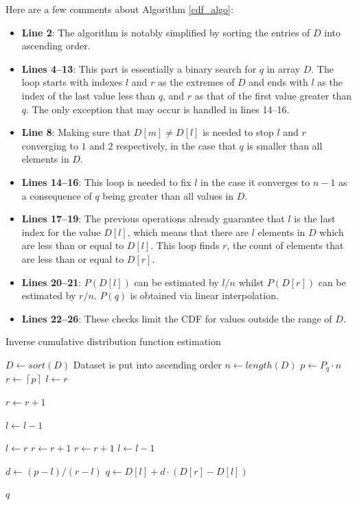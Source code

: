 \documentclass[10pt,final]{siamltex}
\begin{document}
Here are a few comments about Algorithm \ref{cdf_algo}:
\begin{itemize}
  \item \textbf{Line 2}: The algorithm is notably simplified by sorting the entries of $D$ into ascending order.
  \item \textbf{Lines 4--13}: This part is essentially a binary search for $q$ in array $D$. The loop starts with indexes $l$ and $r$ as the extremes of $D$ and ends with $l$ as the index of the last value less than $q$, and $r$ as that of the first value greater than $q$. The only exception that may occur is handled in lines 14--16.
  \item \textbf{Line 8}: Making sure that $D[m]\neq D[l]$ is needed to stop $l$ and $r$ converging to $1$ and $2$ respectively, in the case that $q$ is smaller than all elements in $D$.
  \item \textbf{Lines 14--16}: This loop is needed to fix $l$ in the case it converges to $n-1$ as a consequence of $q$ being greater than all values in $D$.
  \item \textbf{Lines 17--19}: The previous operations already guarantee that $l$ is the last index for the value $D[l]$, which means that there are $l$ elements in $D$ which are less than or equal to $D[l]$. This loop finds $r$, the count of elements that are less than or equal to $D[r]$.
  \item \textbf{Lines 20--21}: $P(D[l])$ can be estimated by $l/n$ whilst $P(D[r])$ can be estimated by $r/n$. $P(q)$ is obtained via linear interpolation.
  \item \textbf{Lines 22--26}: These checks limit the CDF for values outside the range of $D$.
\end{itemize}
%

\begin{algorithm}
  \caption{Inverse cumulative distribution function estimation}
  \label{invcdf_algo}
  \begin{algorithmic}[1]
    \State $D \gets sort(D)$
    \Comment Dataset is put into ascending order
    \State $n \gets length(D)$
    \State $p \gets P_q \cdot n$
    \State $r \gets  \left \lceil{p}\right \rceil$
    \EndIf
    \State $l \gets r$

    \State $ r \gets r + 1$
    \EndWhile

    \State $l \gets l - 1$
    \EndWhile

    \State $l \gets r$
    \State $r \gets r+1$
    \State $r \gets r + 1$
    \EndWhile
    \Else
    \State $ l \gets l - 1$
    \EndIf

    \State $d \gets (p-l)/(r-l) $
    \State $q \gets D[l] + d \cdot (D[r]-D[l])$

    \State \Return $q$
    \EndFunction
  \end{algorithmic}
\end{algorithm}
\end{document}

